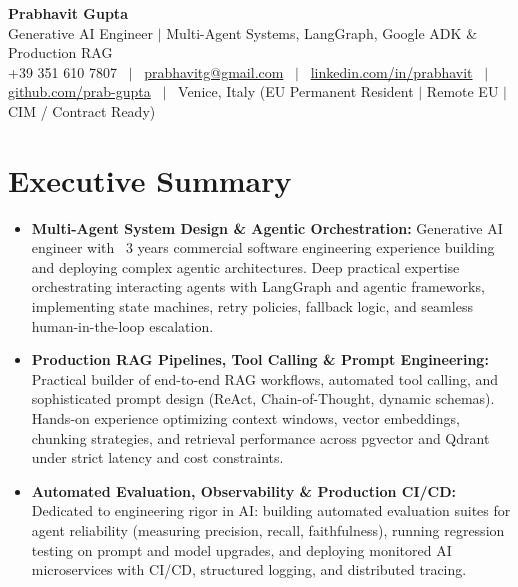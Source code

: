 \documentclass[a4paper,10pt]{article}
\begin{document}
\begin{minipage}[c]{0.80\textwidth}
  {\Huge\bfseries Prabhavit Gupta}\\[3pt]
  {\color{accent}\large Generative AI Engineer $\vert$ Multi-Agent Systems, LangGraph, Google ADK $\&$ Production RAG}\\[6pt]
  {\footnotesize +39 351 610 7807 ~$\vert$~
  \href{mailto:prabhavitg@gmail.com}{prabhavitg@gmail.com} ~$\vert$~
  \href{https://www.linkedin.com/in/prabhavit/}{linkedin.com/in/prabhavit} ~$\vert$~
  \href{https://github.com/prab-gupta}{github.com/prab-gupta} ~$\vert$~
  Venice, Italy (EU Permanent Resident $\vert$ Remote EU $\vert$ CIM / Contract Ready)}
\end{minipage}\hfill

\vspace{6pt}

\section{Executive Summary}
\begin{itemize}
  \item \textbf{Multi-Agent System Design \& Agentic Orchestration:} Generative AI engineer with ~3 years commercial software engineering experience building and deploying complex agentic architectures. Deep practical expertise orchestrating interacting agents with LangGraph and agentic frameworks, implementing state machines, retry policies, fallback logic, and seamless human-in-the-loop escalation.
  \item \textbf{Production RAG Pipelines, Tool Calling \& Prompt Engineering:} Practical builder of end-to-end RAG workflows, automated tool calling, and sophisticated prompt design (ReAct, Chain-of-Thought, dynamic schemas). Hands-on experience optimizing context windows, vector embeddings, chunking strategies, and retrieval performance across pgvector and Qdrant under strict latency and cost constraints.
  \item \textbf{Automated Evaluation, Observability \& Production CI/CD:} Dedicated to engineering rigor in AI: building automated evaluation suites for agent reliability (measuring precision, recall, faithfulness), running regression testing on prompt and model upgrades, and deploying monitored AI microservices with CI/CD, structured logging, and distributed tracing.
\end{itemize}
\end{document}
